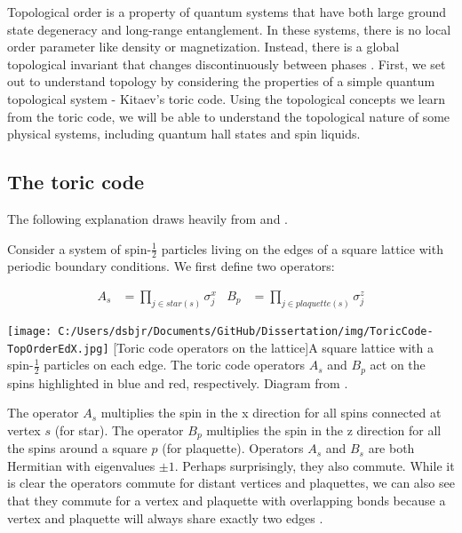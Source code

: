 Topological order is a property of quantum systems that have both large ground state degeneracy and long-range entanglement. In these systems, there is no local order parameter like density or magnetization. Instead, there is a global topological invariant that changes discontinuously between phases \cite{Wen2017}. First, we set out to understand topology by considering the properties of a simple quantum topological system - Kitaev's toric code. Using the topological concepts we learn from the toric code, we will be able to understand the topological nature of some physical systems, including quantum hall states and spin liquids.

\subsection{The toric code}

The following explanation draws heavily from \cite{Kitaev2003} and \cite{topOrderEdX}.

Consider a system of spin-$\frac{1}{2}$ particles living on the edges of a square lattice with periodic boundary conditions. We first define two operators:

\begin{align*}
A_s&=\prod_{j \in star(s)} \sigma^{x}_{j} 		& B_{p}&=\prod_{j \in plaquette(s)} \sigma^{z}_{j}
\end{align*}

\begin{centering}
\texttt{[image: C:/Users/dsbjr/Documents/GitHub/Dissertation/img/ToricCode-TopOrderEdX.jpg]}
  \captionsetup{width=0.9\textwidth}
  [Toric code operators on the lattice]{A square lattice with a spin-$\frac{1}{2}$ particles on each edge. The toric code operators $A_{s}$ and $B_{p}$ act on the spins highlighted in blue and red, respectively. Diagram from \cite{topOrderEdX}.}
  \label{fig:toricCode1}
\end{centering}

The operator $A_{s}$ multiplies the spin in the x direction for all spins connected at vertex $s$ (for star). The operator $B_{p}$ multiplies the spin in the z direction for all the spins around a square $p$ (for plaquette). Operators $A_{s}$ and $B_{s}$ are both Hermitian with eigenvalues $\pm 1$. Perhaps surprisingly, they also commute. While it is clear the operators commute for distant vertices and plaquettes, we can also see that they commute for a vertex and plaquette with overlapping bonds because a vertex and plaquette will always share exactly two edges \cite{Kitaev2003}.

